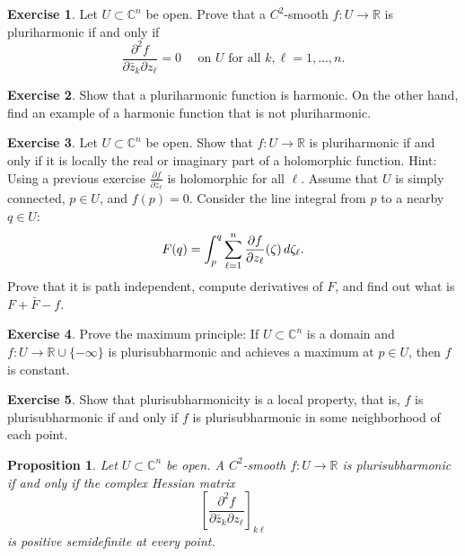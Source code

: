 \documentclass[12pt,openany]{book}
\newcommand{\avoidbreak}{\postdisplaypenalty=100}
\newcommand{\C}{{\mathbb{C}}}
\newcommand{\R}{{\mathbb{R}}}
\theoremstyle{plain}
\newtheorem{prop}[thm]{Proposition}
\theoremstyle{remark}
\theoremstyle{definition}
\newenvironment{exbox}{%
    \def\FrameCommand{\vrule width 1pt \relax\hspace{10pt}}%
    \MakeFramed{\advance\hsize-\width\FrameRestore}%
}{%
    \endMakeFramed
}
\theoremstyle{exercise}
\newtheorem{exercise}{Exercise}[section]
\theoremstyle{example}
\begin{document}
\begin{exbox}
\begin{exercise}
Let $U \subset \C^n$ be open.
Prove that
a $C^2$-smooth $f \colon U \to \R$ is pluriharmonic if and
only if
\begin{equation*}
\frac{\partial^2 f}{\partial \bar{z}_k \partial z_\ell} = 0
\quad \text{ on $U$ for all $k,\ell=1,\ldots,n$.}
\end{equation*}
\end{exercise}

\begin{exercise}
Show that a pluriharmonic function is harmonic.  On the other hand, find an
example of a harmonic function that is not pluriharmonic.
\end{exercise}

\begin{exercise}
Let $U \subset \C^n$ be open.
Show that $f \colon U \to \R$ is pluriharmonic if and
only if it is locally the real or imaginary part of a holomorphic function.
Hint:  Using a previous exercise
$\frac{\partial f}{\partial z_\ell}$ is holomorphic for all $\ell$.
Assume that $U$ is simply connected, $p \in U$, and
$f(p) = 0$.
Consider the line integral from $p$ to a nearby $q \in U$:
\begin{equation*}
F(q) =
\int_{p}^q \sum_{\ell=1}^n
\frac{\partial f}{\partial z_\ell}(\zeta) \, d\zeta_\ell .
\avoidbreak
\end{equation*}
Prove that it is path independent, compute derivatives of $F$, and
find out what is $F+\bar{F}-f$.
\end{exercise}

\begin{exercise}
Prove the maximum
principle:
If $U \subset \C^n$ is a domain and $f \colon U \to \R \cup
\{-\infty\}$ is
plurisubharmonic and achieves a maximum at $p \in U$, then $f$ is constant.
\end{exercise}

\begin{exercise}
Show that plurisubharmonicity is a local property, that is,
$f$ is plurisubharmonic if and only if $f$ is plurisubharmonic in
some neighborhood of each point.
\end{exercise}
\end{exbox}

\begin{samepage}
\begin{prop}
Let $U \subset \C^n$ be open.
A $C^2$-smooth $f \colon U \to \R$ is plurisubharmonic
if and only if the complex Hessian matrix
\begin{equation*}
\left[
\frac{\partial^2 f}{\partial \bar{z}_k \partial z_\ell}
\right]_{k\ell}
\end{equation*}
is positive semidefinite at every
point.
\end{prop}
\end{samepage}
\end{document}
